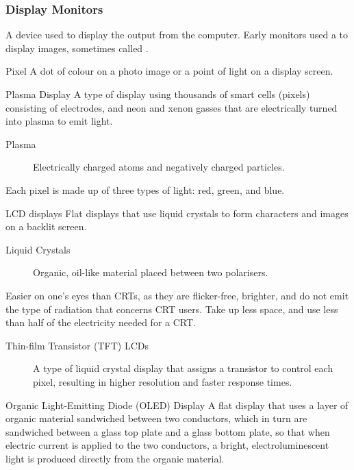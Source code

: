 \documentclass[\main/notes.tex]{subfiles}
\begin{document}
				\subsubsection{Display Monitors}
					A device used to display the output from the computer. Early monitors used a  to display images, sometimes called .
					\begin{definition}{Pixel}
						A dot of colour on a photo image or a point of light on a display screen.
					\end{definition}
					\begin{definition}{Plasma Display}
						A type of display using thousands of smart cells (pixels) consisting of electrodes, and neon and xenon gasses that are electrically turned into plasma to emit light.
						\begin{description}
							\item[Plasma] Electrically charged atoms and negatively charged particles. 
						\end{description}
						Each pixel is made up of three types of light: red, green, and blue.
					\end{definition}
					\begin{definition}{LCD displays}
						Flat displays that use liquid crystals to form characters and images on a backlit screen.
						\begin{description}
							\item[Liquid Crystals] Organic, oil-like material placed between two polarisers. 
						\end{description}
						Easier on one's eyes than CRTs, as they are flicker-free, brighter, and do not emit the type of radiation that concerns CRT users. Take up less space, and use less than half of the electricity needed for a CRT.
						\begin{description}
							\item[Thin-film Transistor (TFT) LCDs] A type of liquid crystal display that assigns a transistor to control each pixel, resulting in higher resolution and faster response times.
						\end{description}
					\end{definition}
					\begin{definition}{Organic Light-Emitting Diode (OLED) Display}
						A flat display that uses a layer of organic material sandwiched between two conductors, which in turn are sandwiched between a glass top plate and a glass bottom plate, so that when electric current is applied to the two conductors, a bright, electroluminescent light is produced directly from the organic material.
					\end{definition}
\end{document}
